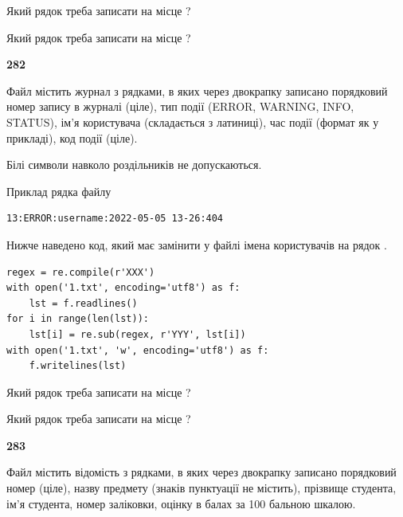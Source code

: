 Який рядок треба записати на місце  ?\par
\vspace{5mm}


Який рядок треба записати на місце  ?\par


\newpage

{\begin {center}\textbf{ 282}\end {center}}\par
Файл  містить журнал з рядками, в яких через двокрапку записано поряд\-ко\-вий номер запису в журналі (ціле), тип події (ERROR, WARNING, INFO, STATUS), ім'я користувача (складається з латиниці), час події (фор\-мат як у прикладі), код події (ціле).

Білі символи навколо роздільників не допускаються.

Приклад рядка файлу



\begin{verbatim}
13:ERROR:username:2022-05-05 13-26:404
\end{verbatim}


Нижче наведено код, який має замінити у файлі імена користувачів на рядок .



\begin{verbatim}
regex = re.compile(r'XXX')
with open('1.txt', encoding='utf8') as f:
    lst = f.readlines()
for i in range(len(lst)):
    lst[i] = re.sub(regex, r'YYY', lst[i])
with open('1.txt', 'w', encoding='utf8') as f:
    f.writelines(lst)
\end{verbatim}







Який рядок треба записати на місце  ?\par
\vspace{5mm}


Який рядок треба записати на місце  ?\par


\newpage

{\begin {center}\textbf{ 283}\end {center}}\par
Файл  містить відомість з рядками, в яких через двокрапку записано поряд\-ковий номер (ціле), назву предмету (знаків пунктуації не містить), прізвище студента, ім'я студента, номер заліковки, оцінку в балах за 100 бальною шкалою.

